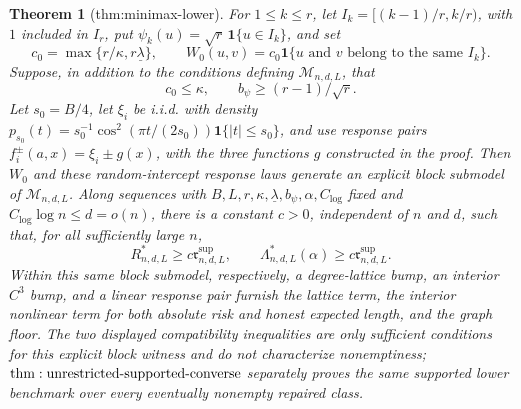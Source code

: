\documentclass{article}
\newtheorem{theorem}{Theorem}
\begin{document}
\begin{theorem}[thm:minimax-lower]\label{thm:minimax-lower}
For \(1\leq k\leq r\), let \(I_k=[(k-1)/r,k/r)\), with \(1\) included in \(I_r\), put \(\psi_k(u)=\sqrt r\,\mathbf 1\{u\in I_k\}\), and set
\[
 c_0=\max\{r/\kappa,r\underline\lambda\},
 \qquad
 W_0(u,v)=c_0\mathbf 1\{u\text{ and }v\text{ belong to the same }I_k\}.
\]
Suppose, in addition to the conditions defining \(\mathcal M_{n,d,L}\), that
\[
 c_0\leq\kappa,
 \qquad
 b_\psi\geq (r-1)/\sqrt r.
\]
Let \(s_0=B/4\), let \(\xi_i\) be i.i.d. with density \(p_{s_0}(t)=s_0^{-1}\cos^2(\pi t/(2s_0))\mathbf 1\{|t|\leq s_0\}\), and use response pairs \(f_i^\pm(a,x)=\xi_i\pm g(x)\), with the three functions \(g\) constructed in the proof.  Then \(W_0\) and these random-intercept response laws generate an explicit block submodel of \(\mathcal M_{n,d,L}\).  Along sequences with \(B,L,r,\kappa,\underline\lambda,b_\psi,\alpha,C_{\log}\) fixed and \(C_{\log}\log n\leq d=o(n)\), there is a constant \(c>0\), independent of \(n\) and \(d\), such that, for all sufficiently large \(n\),
\[
 R^*_{n,d,L}\geq c\mathfrak r^{\mathrm{sup}}_{n,d,L},
 \qquad
 \Lambda^*_{n,d,L}(\alpha)\geq c\mathfrak r^{\mathrm{sup}}_{n,d,L}.
\]
Within this same block submodel, respectively, a degree-lattice bump, an interior \(C^3\) bump, and a linear response pair furnish the lattice term, the interior nonlinear term for both absolute risk and honest expected length, and the graph floor.  The two displayed compatibility inequalities are only sufficient conditions for this explicit block witness and do not characterize nonemptiness; \({\rm thm:unrestricted\text{-}supported\text{-}converse}\) separately proves the same supported lower benchmark over every eventually nonempty repaired class.
\end{theorem}
\end{document}
